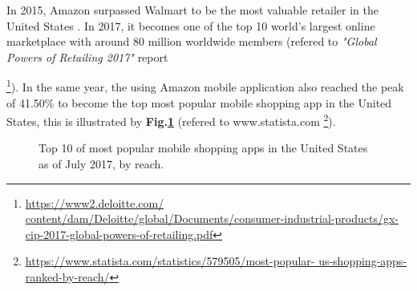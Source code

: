 In 2015, Amazon surpassed Walmart to be the most valuable retailer in the United States \cite{kantor2015inside}. 
In 2017, it becomes one of the top 10 world's largest online marketplace with around 80 million worldwide members 
(refered to \textit{"Global Powers of Retailing 2017"} report {\footnote{\url{https://www2.deloitte.com/
content/dam/Deloitte/global/Documents/consumer-industrial-products/gx-cip-2017-global-powers-of-retailing.pdf}}). 
In the same year, the using Amazon mobile application also reached the peak of 41.50\% to become the top most 
popular mobile shopping app in the United States, this is illustrated by \textbf{Fig.\ref{fig:statistic}} 
(refered to www.statista.com {\footnote{\url{https://www.statista.com/statistics/579505/most-popular-
us-shopping-apps-ranked-by-reach/}}}). 

\begin{figure}[!h]
	\begin{center}
	\end{center}
	\caption{\label{fig:statistic} Top 10 of most popular mobile shopping apps in the United States as of July 2017, by reach.}
\end{figure}

}
